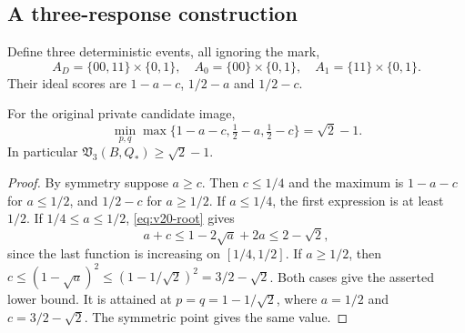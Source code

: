 \subsection{A three-response construction}
Define three deterministic events, all ignoring the mark,
\[
 A_D=\{00,11\}\times\{0,1\},\quad
 A_0=\{00\}\times\{0,1\},\quad
 A_1=\{11\}\times\{0,1\}.
\]
Their ideal scores are $1-a-c$, $1/2-a$ and $1/2-c$.

\begin{lemma}
\label{lem:v20-envelope}
For the original private candidate image,
\begin{equation}\label{eq:v20-envelope}
 \min_{p,q}\max\{1-a-c,\tfrac12-a,\tfrac12-c\}=\sqrt2-1.
\end{equation}
In particular $\mathfrak V_3(B,Q_*)\ge\sqrt2-1$.
\end{lemma}
\begin{proof}
By symmetry suppose $a\ge c$. Then $c\le1/4$ and the maximum is
$1-a-c$ for $a\le1/2$, and $1/2-c$ for $a\ge1/2$.
If $a\le1/4$, the first expression is at least $1/2$. If
$1/4\le a\le1/2$, \eqref{eq:v20-root} gives
\[
 a+c\le1-2\sqrt a+2a\le2-\sqrt2,
\]
since the last function is increasing on $[1/4,1/2]$.
If $a\ge1/2$, then
$c\le(1-\sqrt a)^2\le(1-1/\sqrt2)^2=3/2-\sqrt2$.
Both cases give the asserted lower bound. It is attained at
$p=q=1-1/\sqrt2$, where $a=1/2$ and $c=3/2-\sqrt2$.
The symmetric point gives the same value.
\end{proof}

